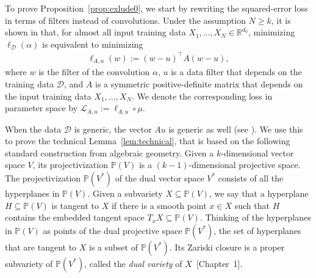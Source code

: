 \documentclass[twoside]{article}
\theoremstyle{definition}
\theoremstyle{remark}
\begin{document}
\iffalse
To prove Proposition~\ref{prop:exlude0}, we start by rewriting the squared-error loss in terms of filters instead of  convolutions.
Under the assumption $N \geq k$, it is shown in \cite[Corollary~7.2]{kohn2024function}
that, for almost all input training data $X_1, \ldots, X_N \in \mathbb{R}^{d_0}$, 
minimizing $\ell_\mathcal{D}(\alpha)$ is equivalent to minimizing
\begin{align*}
    \ell_{A,u}(w) := (w-u)^\top A (w-u),
\end{align*}
where $w$ is the filter of the convolution $\alpha$, 
$u$ is a data filter that depends on the training data $\mathcal{D}$,
and $A$ is a symmetric positive-definite matrix that depends on the input training data $X_1,\ldots,X_N$.
We denote the corresponding loss in parameter space by $\mathcal{L}_{A,u} := \ell_{A,u} \circ \mu$.

When the data $\mathcal{D}$ is generic, the vector $Au$ is generic as well (see \cite[Section~7]{kohn2024function}). 
We use this to prove the  technical Lemma~\ref{lem:technical}, that is based on the following standard construction from algebraic geometry. 
Given a $k$-dimensional vector space $V$, its projectivization $\mathbb{P}(V)$ is a $(k-1)$-dimensional projective space.
The projectivization $\mathbb{P}(V^\ast)$ of the dual vector space $V^\ast$ consists of all the hyperplanes in  $\mathbb{P}(V)$.
Given a subvariety $X \subseteq \mathbb{P}(V)$, we say that a hyperplane $H \subseteq \mathbb{P}(V)$ is tangent to $X$ if there is a smooth point $x \in X$ such that $H$ contains the embedded tangent space $T_x X \subseteq \mathbb{P}(V)$.
Thinking of the hyperplanes in $\mathbb{P}(V)$ as points of the dual projective space $\mathbb{P}(V^\ast)$, the set of hyperplanes that are tangent to $X$ is a subset of $\mathbb{P}(V^\ast)$.
Its Zariski closure is a proper subvariety of $\mathbb{P}(V^\ast)$, called the \emph{dual variety} of $X$~[Chapter~1]\cite{gkz}.
\end{document}
